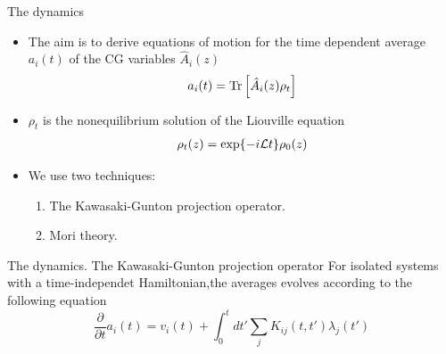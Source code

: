 \documentclass{beamer}
\begin{document}
\begin{frame}{The dynamics}
  \begin{itemize}
    \item The aim is to \alert{derive equations of motion} for the time dependent average $a_i(t)$ of the CG variables $\hat{A}_i(z)$
      \begin{align}
        a_i(t)={\rm Tr}\left[\hat{A}_i(z)\rho_t\right]
        \nonumber
      \end{align}
\item $\rho_t$ is the nonequilibrium solution of the Liouville equation
\begin{align}
    \rho_t(z) = {\rm exp}\{-i{\cal L}t\}\rho_0(z)
    \nonumber
\end{align}
\item We use two techniques:
  \begin{enumerate}
    \item The Kawasaki-Gunton projection operator.
    \item Mori theory.
    \end{enumerate}
  \end{itemize}
\end{frame}

\begin{frame}{The dynamics. The Kawasaki-Gunton projection operator}
    For isolated systems with a time-independet Hamiltonian,the averages evolves according to the following equation \cite{Grabert1982}
      \begin{equation}
\frac{\partial }{\partial t} a_i(t)
= v_i(t) + \int_0^t dt' \sum_j K_{ij}(t,t') \lambda_j(t')
\nonumber
\end{equation}
\end{frame}
\end{document}
